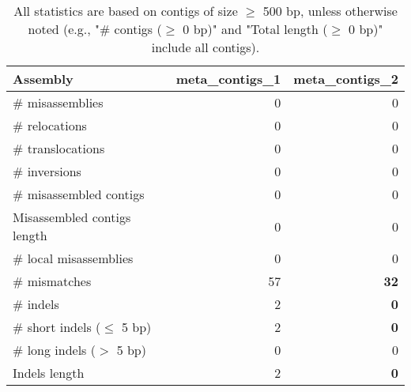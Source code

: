 \documentclass[12pt,a4paper]{article}
\begin{document}
\begin{table}[ht]
\begin{center}
\caption{All statistics are based on contigs of size $\geq$ 500 bp, unless otherwise noted (e.g., "\# contigs ($\geq$ 0 bp)" and "Total length ($\geq$ 0 bp)" include all contigs).}
\begin{tabular}{|l*{2}{|r}|}
\hline
Assembly & meta\_contigs\_1 & meta\_contigs\_2 \\ \hline
\# misassemblies & 0 & 0 \\ \hline
\hspace{5mm}\# relocations & 0 & 0 \\ \hline
\hspace{5mm}\# translocations & 0 & 0 \\ \hline
\hspace{5mm}\# inversions & 0 & 0 \\ \hline
\# misassembled contigs & 0 & 0 \\ \hline
Misassembled contigs length & 0 & 0 \\ \hline
\# local misassemblies & 0 & 0 \\ \hline
\# mismatches & 57 & {\bf 32} \\ \hline
\# indels & 2 & {\bf 0} \\ \hline
\hspace{5mm}\# short indels ($\leq$ 5 bp) & 2 & {\bf 0} \\ \hline
\hspace{5mm}\# long indels ($>$ 5 bp) & 0 & 0 \\ \hline
Indels length & 2 & {\bf 0} \\ \hline
\end{tabular}
\end{center}
\end{table}
\end{document}
